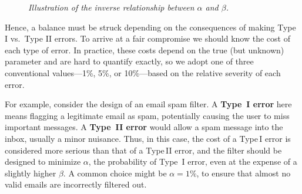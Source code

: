 \documentclass[twoside]{book}
\begin{document}
\begin{figure}[H]
	\centering
	\caption{\textit{Illustration of the inverse relationship between \(\alpha\) and \(\beta\).}}
	\label{fig:alpha_beta_tradeoff}
\end{figure}

Hence, a balance must be struck depending on the consequences of making Type I vs.\ Type II errors. To arrive at a fair compromise we should know the cost of each type of error. In practice, these costs depend on the true (but unknown) parameter and are hard to quantify exactly, so we adopt one of three conventional values—1\%, 5\%, or 10\%—based on the relative severity of each error.

For example, consider the design of an email spam filter. A \textbf{Type~I error} here means flagging a legitimate email as spam, potentially causing the user to miss important messages. A \textbf{Type~II error} would allow a spam message into the inbox, usually a minor nuisance. Thus, in this case, the cost of a Type I error is considered more serious than that of a Type II error, and the filter should be designed to minimize $\alpha$, the probability of Type~I error, even at the expense of a slightly higher $\beta$. A common choice might be $\alpha = 1\%$, to ensure that almost no valid emails are incorrectly filtered out.
\end{document}
